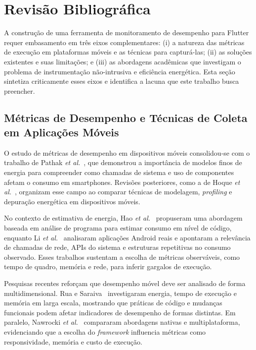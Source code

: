 \section{Revisão Bibliográfica}

A construção de uma ferramenta de monitoramento de desempenho para Flutter requer embasamento em três eixos complementares: (i) a natureza das métricas de execução em plataformas móveis e as técnicas para capturá-las; (ii) as soluções existentes e suas limitações; e (iii) as abordagens acadêmicas que investigam o problema de instrumentação não-intrusiva e eficiência energética. Esta seção sintetiza criticamente esses eixos e identifica a lacuna que este trabalho busca preencher.

\subsection*{Métricas de Desempenho e Técnicas de Coleta em Aplicações Móveis}

O estudo de métricas de desempenho em dispositivos móveis consolidou-se com o trabalho de Pathak \textit{et al.}~\cite{pathak2012energy}, que demonstrou a importância de modelos finos de energia para compreender como chamadas de sistema e uso de componentes afetam o consumo em smartphones. Revisões posteriores, como a de Hoque \textit{et al.}~\cite{hoque2015energy}, organizam esse campo ao comparar técnicas de modelagem, \textit{profiling} e depuração energética em dispositivos móveis.

No contexto de estimativa de energia, Hao \textit{et al.}~\cite{hao2013estimating} propuseram uma abordagem baseada em análise de programa para estimar consumo em nível de código, enquanto Li \textit{et al.}~\cite{li2014empirical} analisaram aplicações Android reais e apontaram a relevância de chamadas de rede, APIs do sistema e estruturas repetitivas no consumo observado. Esses trabalhos sustentam a escolha de métricas observáveis, como tempo de quadro, memória e rede, para inferir gargalos de execução.

Pesquisas recentes reforçam que desempenho móvel deve ser analisado de forma multidimensional. Rua e Saraiva~\cite{rua2024largescale} investigaram energia, tempo de execução e memória em larga escala, mostrando que práticas de código e mudanças funcionais podem afetar indicadores de desempenho de formas distintas. Em paralelo, Nawrocki \textit{et al.}~\cite{nawrocki2021crossplatform} compararam abordagens nativas e multiplataforma, evidenciando que a escolha do \textit{framework} influencia métricas como responsividade, memória e custo de execução.

